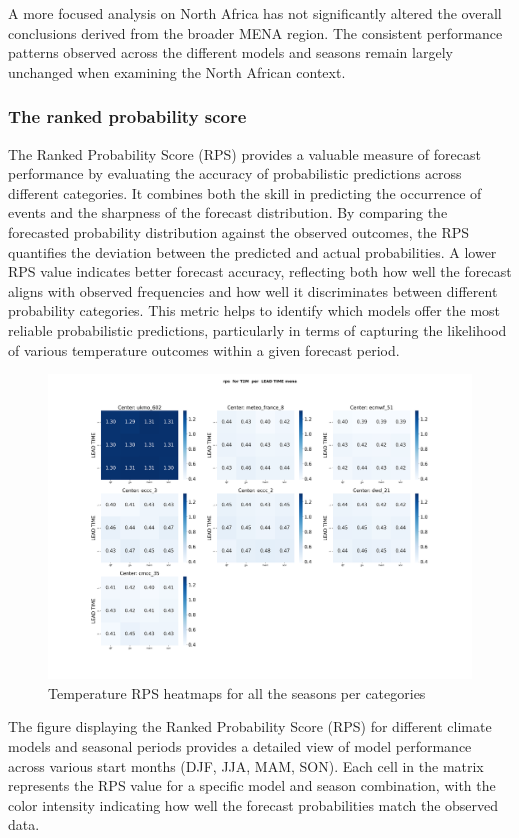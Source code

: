 A more focused analysis on North Africa has not significantly altered the overall conclusions derived from the broader MENA region. The consistent performance patterns observed across the different models and seasons remain largely unchanged when examining the North African context. 




\subsubsection{The ranked probability score }

The Ranked Probability Score (RPS) provides a valuable measure of forecast performance by evaluating the accuracy of probabilistic predictions across different categories. It combines both the skill in predicting the occurrence of events and the sharpness of the forecast distribution. By comparing the forecasted probability distribution against the observed outcomes, the RPS quantifies the deviation between the predicted and actual probabilities. A lower RPS value indicates better forecast accuracy, reflecting both how well the forecast aligns with observed frequencies and how well it discriminates between different probability categories. This metric helps to identify which models offer the most reliable probabilistic predictions, particularly in terms of capturing the likelihood of various temperature outcomes within a given forecast period.
\begin{figure}[H]
    \centering
    \includegraphics[width=1\linewidth]{plots/prob/rps/rps_T2M_mena.png}
    \caption{Temperature RPS  heatmaps for all the seasons per categories}
\end{figure}
The figure displaying the Ranked Probability Score (RPS) for different climate models and seasonal periods provides a detailed view of model performance across various start months (DJF, JJA, MAM, SON). Each cell in the matrix represents the RPS value for a specific model and season combination, with the color intensity indicating how well the forecast probabilities match the observed data.

